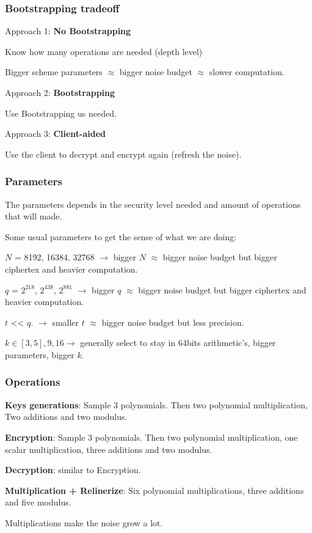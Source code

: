 \documentclass[10pt]{beamer}
\begin{document}
\begin{frame}
    \frametitle{Bootstrapping tradeoff}

    Approach 1: \textbf{No Bootstrapping}

    Know how many operations are needed (depth level)

    Bigger scheme parameters $\approx$ bigger noise budget $\approx$ slower computation.

    Approach 2: \textbf{Bootstrapping}

    Use Bootstrapping us needed.

    Approach 3: \textbf{Client-aided}

    Use the client to decrypt and encrypt again (refresh the noise).
\end{frame}




\begin{frame}
\frametitle{Parameters}

The parameters depends in the security level needed and amount of operations that will made.


Some usual parameters to get the sense of what we are doing:

$N$ = 8192, 16384, 32768 $\rightarrow$ bigger $N$ $\approx$ bigger noise budget but bigger ciphertex and heavier computation.

    $q$ = $2^{218}$,   $2^{438}$,  $2^{881}$ $\rightarrow$ bigger $q$ $\approx$ bigger noise budget but bigger ciphertex and heavier computation.

    $t$  << $q$. $\rightarrow$ smaller $t$ $\approx$ bigger noise budget but less precision.

    $k\in [3,5], 9, 16 \rightarrow$ generally select to stay in 64bits arithmetic's, bigger parameters, bigger $k$.


\end{frame}

\begin{frame}
\frametitle{Operations}

    \textbf{Keys generations}: Sample 3 polynomials. Then two polynomial multiplication, Two additions and two modulus.

    \textbf{Encryption}: Sample 3 polynomials. Then two polynomial multiplication, one scalar multiplication, three additions and two modulus.

    \textbf{Decryption}: similar to Encryption.

    \textbf{Multiplication + Relinerize}: Six polynomial multiplications, three additions and five modulus.

   Multiplications make the noise grow a lot.


\end{frame}
\end{document}
